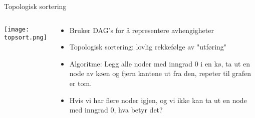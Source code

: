 \documentclass[norsk, handout]{beamer}
\begin{document}
	\begin{frame}{Topologisk sortering}
		\begin{columns}
			\texttt{[image: topsort.png]}

			\begin{footnotesize}
			\begin{itemize}
				\item Bruker DAG's for å representere avhengigheter
				\item Topologisk sortering: lovlig rekkefølge av "utføring"
					\pause
				\item Algoritme: Legg alle noder med inngrad 0 i en kø, ta ut en node av
					køen og fjern kantene ut fra den, repeter til grafen er tom.
					\pause
				\item Hvis vi har flere noder igjen, og vi ikke kan ta ut en node med
					inngrad 0, hva betyr det?
			\end{itemize}
		\end{footnotesize}

		\end{columns}
	\end{frame}
\end{document}
